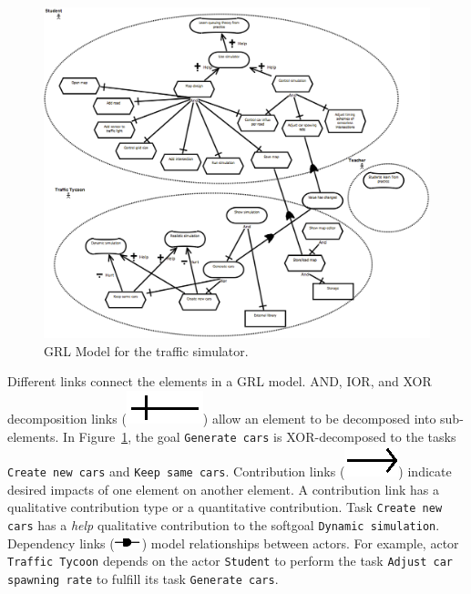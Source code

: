 \begin{figure}[ht]
\centering
\includegraphics[width=\textwidth]{img/transcript_grl_0}
\caption{GRL Model for the traffic simulator.}
\label{fig:trafficsim}
\end{figure}

Different links connect the elements in a GRL model. AND, IOR, and XOR decomposition links (\includegraphics[scale=1]{img/decomposition}) allow an element to be decomposed into sub-elements. In Figure~\ref{fig:trafficsim}, the goal  \texttt{Generate cars} is XOR-decomposed to the tasks \texttt{Create new cars} and \texttt{Keep same cars}. Contribution links (\includegraphics[scale=1]{img/contribution}) indicate desired impacts of one element on another element. A contribution link has a qualitative contribution type or a quantitative contribution. Task  \texttt{Create new cars} has a \emph{help} qualitative contribution to the softgoal  \texttt{Dynamic simulation}. Dependency links (\includegraphics[scale=1]{img/dependency}) model relationships between actors. For example, actor  \texttt{Traffic Tycoon} depends on the actor  \texttt{Student} to perform the task  \texttt{Adjust car spawning rate} to fulfill its task  \texttt{Generate cars}.

